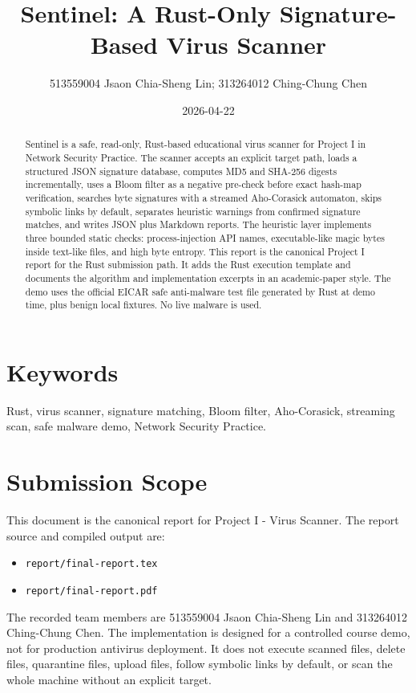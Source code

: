 \documentclass[11pt]{article}
\title{Sentinel: A Rust-Only Signature-Based Virus Scanner}
\author{513559004 Jsaon Chia-Sheng Lin; 313264012 Ching-Chung Chen}
\date{2026-04-22}
\begin{document}
\maketitle

\begin{abstract}
Sentinel is a safe, read-only, Rust-based educational virus scanner for Project
I in Network Security Practice. The scanner accepts an explicit target path,
loads a structured JSON signature database, computes MD5 and SHA-256 digests
incrementally, uses a Bloom filter as a negative pre-check before exact hash-map
verification, searches byte signatures with a streamed Aho-Corasick automaton,
skips symbolic links by default, separates heuristic warnings from confirmed
signature matches, and writes JSON plus Markdown reports. The heuristic layer
implements three bounded static checks: process-injection API names,
executable-like magic bytes inside text-like files, and high byte entropy. This
report is the canonical Project I report for the Rust submission path. It adds
the Rust execution template and documents the algorithm and implementation
excerpts in an academic-paper style. The demo uses the official EICAR safe
anti-malware test file generated by Rust at demo time, plus benign local
fixtures. No live malware is used.
\end{abstract}

\section*{Keywords}

Rust, virus scanner, signature matching, Bloom filter, Aho-Corasick,
streaming scan, safe malware demo, Network Security Practice.

\section{Submission Scope}

This document is the canonical report for Project I - Virus Scanner. The report
source and compiled output are:

\begin{itemize}[leftmargin=*]
  \item \texttt{report/final-report.tex}
  \item \texttt{report/final-report.pdf}
\end{itemize}

The recorded team members are 513559004 Jsaon Chia-Sheng Lin and 313264012
Ching-Chung Chen. The implementation is designed for a controlled course demo,
not for production antivirus deployment. It does not execute scanned files,
delete files, quarantine files, upload files, follow symbolic links by default,
or scan the whole machine without an explicit target.
\end{document}
